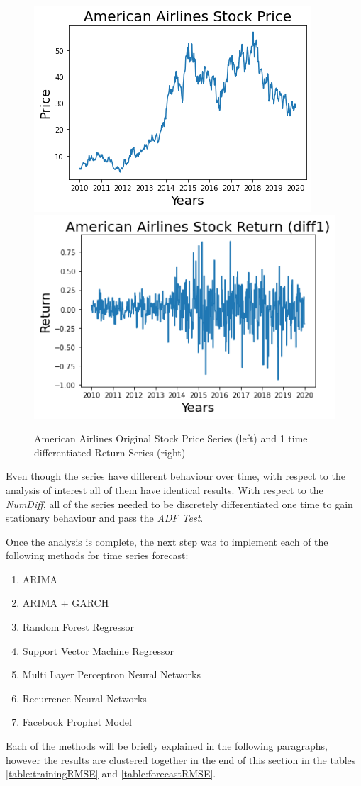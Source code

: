 \documentclass[10pt,twocolumn,letterpaper]{article}
\begin{document}
	\begin{figure}[h]
		\centering
		\includegraphics[width=0.45\linewidth]{../img/SeriesAnalysis/American_Serie}
		\includegraphics[width=0.45\linewidth]{../img/SeriesAnalysis/American_diffSerie}
		\caption{American Airlines Original Stock Price Series (left) and 1 time differentiated Return Series (right)}
		\label{fig:americanserie}
	\end{figure}
	
	
	Even though the series have different behaviour over time, with respect to the analysis of interest all of them have identical results. With respect to the \textit{NumDiff}, all of the series needed to be discretely differentiated one time to gain stationary behaviour and pass the \textit{ADF Test}. 
	
	Once the analysis is complete, the next step was to implement each of the following methods for time series forecast:
	\begin{enumerate}
		\item ARIMA
		\item ARIMA + GARCH
		\item Random Forest Regressor
		\item Support Vector Machine Regressor
		\item Multi Layer Perceptron Neural Networks
		\item Recurrence Neural Networks
		\item Facebook Prophet Model
	\end{enumerate}
	
	Each of the methods will be briefly explained in the following paragraphs, however the results are clustered together in the end of this section in the tables \ref{table:trainingRMSE} and \ref{table:forecastRMSE}.\\
	
\end{document}

